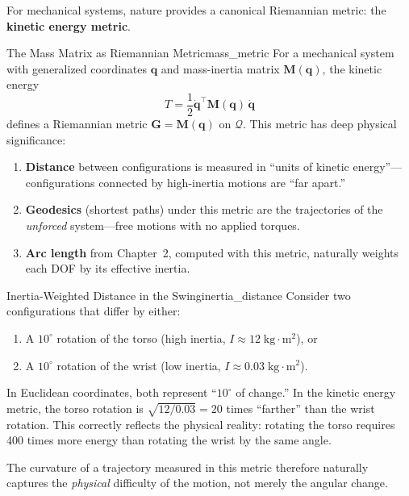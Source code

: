 \documentclass[12pt, openany]{book}
\theoremstyle{plain}
\newcommand{\configspace}{\mathcal{Q}}
\begin{document}
For mechanical systems, nature provides a canonical Riemannian metric: the
\textbf{kinetic energy metric}.

\begin{principle}{The Mass Matrix as Riemannian Metric}{mass_metric}
  For a mechanical system with generalized coordinates $\bm{q}$ and
  mass-inertia matrix $\bm{M}(\bm{q})$, the kinetic energy
  \begin{equation}
    T = \frac{1}{2}\dot{\bm{q}}^\top \bm{M}(\bm{q})\, \dot{\bm{q}}
  \end{equation}
  defines a Riemannian metric $\bm{G} = \bm{M}(\bm{q})$ on $\configspace$.
  This metric has deep physical significance:
  \begin{enumerate}[label=(\roman*)]
    \item \textbf{Distance} between configurations is measured in ``units of
      kinetic energy''---configurations connected by high-inertia motions
      are ``far apart.''
    \item \textbf{Geodesics} (shortest paths) under this metric are the
      trajectories of the \emph{unforced} system---free motions with no
      applied torques.
    \item \textbf{Arc length} from Chapter~2, computed with this metric,
      naturally weights each DOF by its effective inertia.
  \end{enumerate}
\end{principle}

\begin{example}{Inertia-Weighted Distance in the Swing}{inertia_distance}
  Consider two configurations that differ by either:
  \begin{enumerate}[label=(\alph*)]
    \item A $10^\circ$ rotation of the torso (high inertia, $I \approx 12\;\text{kg}\cdot\text{m}^2$), or
    \item A $10^\circ$ rotation of the wrist (low inertia, $I \approx 0.03\;\text{kg}\cdot\text{m}^2$).
  \end{enumerate}
  In Euclidean coordinates, both represent ``$10^\circ$ of change.'' In the
  kinetic energy metric, the torso rotation is $\sqrt{12/0.03} = 20$ times
  ``farther'' than the wrist rotation. This correctly reflects the physical
  reality: rotating the torso requires 400 times more energy than rotating
  the wrist by the same angle.

  The curvature of a trajectory measured in this metric therefore naturally
  captures the \emph{physical} difficulty of the motion, not merely the
  angular change.
\end{example}
\end{document}

